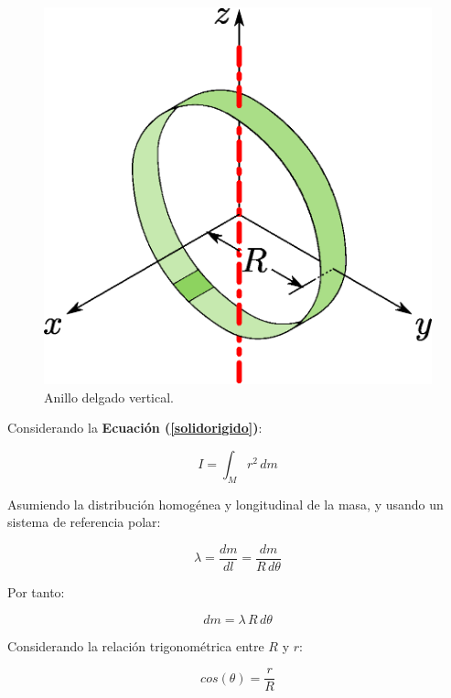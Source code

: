\documentclass[letter,oneside,11pt]{article}
\begin{document}
\begin{figure}
\centering
\includegraphics[scale=0.5]{resources/f8.eps}
\caption{Anillo delgado vertical.}
\label{figura8}
\end{figure}

Considerando la \textbf{Ecuación (\ref{solidorigido})}:

\begin{equation*}
    I = \int_{M} r^2\, dm
\tag{4}
\end{equation*}

Asumiendo la distribución homogénea y longitudinal de la masa, y usando un
sistema de referencia polar:

\begin{equation*}
    \lambda = \frac{dm}{dl} = \frac{dm}{R\, d\theta}
\end{equation*}

Por tanto:

\begin{equation}
    dm = \lambda\, R\, d\theta
\label{dm3}
\end{equation}

Considerando la relación trigonométrica entre $R$ y $r$:

\begin{equation*}
    cos (\theta) = \frac{r}{R}
\end{equation*}
\end{document}

